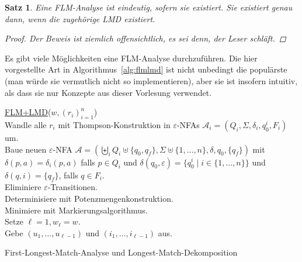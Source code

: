 \documentclass[11pt, a4paper]{article}
\theoremstyle{definition}
\theoremstyle{plain}
\newtheorem{theorem}[definition]{Satz}
\numberwithin{equation}{section}
\begin{document}
\begin{theorem}
	Eine FLM-Analyse ist eindeutig, sofern sie existiert. Sie existiert genau dann, wenn die zugehörige LMD existiert.
	\begin{proof}
		Der Beweis ist ziemlich offensichtlich, es sei denn, der Leser schläft.
	\end{proof}
\end{theorem}
Es gibt viele Möglichkeiten eine FLM-Analyse durchzuführen. Die hier vorgestellte Art in Algorithmus~\ref{alg:flmlmd} ist nicht unbedingt die populärste (man würde sie vermutlich nicht so implementieren), aber sie ist insofern intuitiv, als dass sie nur Konzepte aus dieser Vorlesung verwendet.
\begin{algorithm}
	\underline{FLM+LMD}{($w, (r_i)_{i=1}^n$)}\\
	Wandle alle $r_i$ mit Thompson-Konstruktion in $\varepsilon$-NFAs $\mathcal{A}_i = (Q_i, \Sigma, \delta_i, q_0^i, F_i)$ um.\\
	Baue neuen $\varepsilon$-NFA $\mathcal{A} = (\biguplus_i Q_i \uplus \{q_0, q_f\}, \Sigma \uplus \{1, \ldots, n\}, \delta, q_0, \{q_f\})$ mit $\delta(p, a) = \delta_i(p, a)$ falls $p \in Q_i$ und $\delta(q_0, \varepsilon) = \{q_0^i \mid i \in \{1, \ldots, n\}\}$ und $\delta(q, i) = \{q_f\}$, falls $q \in F_i$.\\
	Eliminiere $\varepsilon$-Transitionen.\\
	Determinisiere mit Potenzmengenkonstruktion.\\
	Minimiere mit Markierungsalgorithmus.\\
	Setze $\ell = 1, w_\ell = w$.\\
	Gebe $(u_1, \ldots, u_{\ell-1})$ und $(i_1, \ldots, i_{\ell-1})$ aus.
	\caption{First-Longest-Match-Analyse und Longest-Match-Dekomposition}
	\label{alg:flmlmd}
\end{algorithm}
\end{document}
